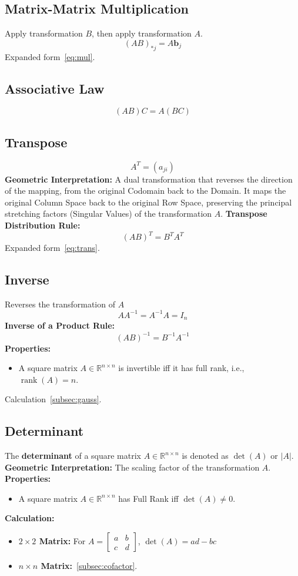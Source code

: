 \documentclass{article}
\begin{document}
\subsection{Matrix-Matrix Multiplication}
Apply transformation $B$, then apply transformation $A$.
\[
    (AB)_{*j} = A\mathbf{b}_j
\]
Expanded form~\ref{eq:mul}.

\subsection{Associative Law}
\[
    (AB)C = A(BC)
\]

\subsection{Transpose}
\[
    A^T = (a_{ji})
\]
\textbf{Geometric Interpretation:} A dual transformation that reverses the direction of the mapping, from the original Codomain back to the Domain. It maps the original Column Space back to the original Row Space, preserving the principal stretching factors (Singular Values) of the transformation $A$.
\newline
\textbf{Transpose Distribution Rule:}
\[
    (AB)^T = B^T A^T
\]
Expanded form~\ref{eq:trans}.

\subsection{Inverse}
Reverses the transformation of $A$
\[
    A A^{-1} = A^{-1} A = I_n
\]
\textbf{Inverse of a Product Rule:}
\[
    (AB)^{-1} = B^{-1}A^{-1}
\]
\textbf{Properties:}
\begin{itemize}
    \item A square matrix $A \in \mathbb{R}^{n \times n}$ is invertible iff it has full rank, i.e., $\operatorname{rank}(A) = n$.
\end{itemize}
Calculation~\ref{subsec:gauss}.

\subsection{Determinant}
The \textbf{determinant} of a square matrix $A \in \mathbb{R}^{n \times n}$ is denoted as $\det(A)$ or $|A|$.
\newline
\textbf{Geometric Interpretation:} The scaling factor of the transformation $A$.
\newline
\textbf{Properties:}
\begin{itemize}
    \item A square matrix $A \in \mathbb{R}^{n \times n}$ has Full Rank iff $\det(A) \neq 0$.
\end{itemize}
\newline
\textbf{Calculation:}
\begin{itemize}
    \item \textbf{$2 \times 2$ Matrix:} For $A = \begin{bmatrix} a & b \\ c & d \end{bmatrix}$, $\det(A) = ad - bc$
    \item \textbf{$n \times n$ Matrix:}~\ref{subsec:cofactor}.
\end{itemize}
\end{document}
